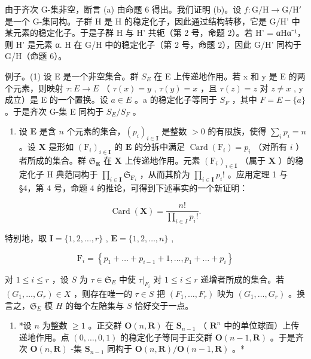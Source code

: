由于齐次 G-集非空，断言 (a) 由命题 6 得出。我们证明 (b)。设 \(f: \mathrm{G} / \mathrm{H} \to \mathrm{G} / \mathrm{H}'\) 是一个 G-集同构。子群 H 是 H 的稳定化子，因此通过结构转移，它是 G/H' 中某元素的稳定化子。于是子群 H 与 H' 共轭（第 2 号，命题 2）。若 H' = αHα⁻¹，则 H' 是元素 α. H 在 G/H 中的稳定化子（第 2 号，命题 2），因此 G/H' 同构于 G/H（命题 6）。

例子。(1) 设 E 是一个非空集合。群 \(S_{E}\) 在 E 上传递地作用。若 x 和 y 是 E 的两个元素，则映射 \(\tau: E \to E\) （ \(\tau(x) = y\) , \(\tau(y) = x\) ，且 \(\tau(z) = z\) 对 \(z \neq x\) , y 成立）是 E 的一个置换。设 \(a \in E\) 。a 的稳定化子等同于 \(S_{F}\) ，其中 \(F = E - \{a\}\) 。于是齐次 G-集 E 同构于 \(S_{E}/S_{F}\) 。

\begin{enumerate}
\def\labelenumi{(\arabic{enumi})}
\setcounter{enumi}{1}
\tightlist
\item
  设 \(\mathbf{E}\) 是含 \(n\) 个元素的集合，\((p_i)_{i\in \mathbf{I}}\) 是整数 \(>0\) 的有限族，使得 \(\sum_{i}p_{i} = n\) 。设 \(\mathbf{X}\) 是形如 \((\mathrm{F}_i)_{i\in \mathbf{I}}\) 的 \(\mathbf{E}\) 的分拆中满足 \(\operatorname {Card}(\mathrm{F}_i) = p_i\) （对所有 \(i\) ）者所成的集合。群 \(\mathfrak{S}_{\mathbf{E}}\) 在 \(\mathbf{X}\) 上传递地作用。元素 \((\mathrm{F}_i)_{i\in \mathbf{I}}\) （属于 \(\mathbf{X}\) ）的稳定化子 H 典范同构于 \(\prod_{i\in \mathbf{I}}\mathfrak{S}_{\mathbf{F}_i}\) ，从而其阶为 \(\prod_{i\in \mathbf{I}}p_i!\) 。应用定理 1 与 §4，第 4 号，命题 4 的推论，可得到下述事实的一个新证明：
\end{enumerate}

\[
\operatorname{Card} (\mathbf {X}) = \frac {n !}{\prod_ {i \in I} p _ {i} !}.
\]

特别地，取 \(\mathbf{I} = \{1,2,\dots,r\}\) , \(\mathbf{E} = \{1,2,\dots,n\}\) ,

\[
\mathrm{F} _ {i} = \left\{p _ {1} + \dots + p _ {i - 1} + 1, \dots , p _ {1} + \dots + p _ {i} \right\}
\]

对 \(1 \leqslant i \leqslant r\) ，设 \(S\) 为 \(\tau \in \mathfrak{S}_{E}\) 中使 \(\tau|_{F_i}\) 对 \(1 \leqslant i \leqslant r\) 递增者所成的集合。若 \((G_1, \ldots, G_r) \in X\) ，则存在唯一的 \(\tau \in S\) 把 \((F_1, \ldots, F_r)\) 映为 \((G_1, \ldots, G_r)\) 。换言之，\(\mathfrak{S}_{E}\) 模 \(H\) 的每个左陪集与 \(S\) 恰好交于一点。

\begin{enumerate}
\def\labelenumi{(\arabic{enumi})}
\setcounter{enumi}{2}
\tightlist
\item
  *设 \(n\) 为整数 \(\geqslant 1\) 。正交群 \(\mathbf{O}(n, \mathbf{R})\) 在 \(\mathbf{S}_{n-1}\) （ \(\mathbf{R}^n\) 中的单位球面）上传递地作用。点 \((0, \ldots, 0, 1)\) 的稳定化子等同于正交群 \(\mathbf{O}(n-1, \mathbf{R})\) 。于是齐次 \(\mathbf{O}(n, \mathbf{R})\) -集 \(\mathbf{S}_{n-1}\) 同构于 \(\mathbf{O}(n, \mathbf{R}) / \mathbf{O}(n-1, \mathbf{R})\) 。*
\end{enumerate}

